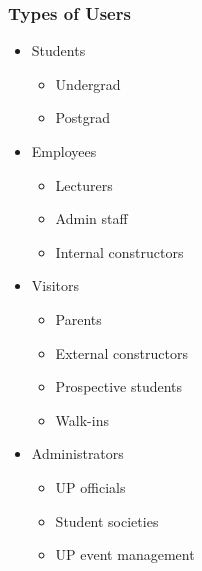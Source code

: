 \documentclass{article}
\begin{document}
		\subsubsection{Types of Users}
			\begin{itemize}
				\item Students
				\begin{itemize}
					\item Undergrad
					\item Postgrad
				\end{itemize}
				
				\item Employees
				\begin{itemize}
					\item Lecturers
					\item Admin staff
					\item Internal constructors
				\end{itemize}
				
				\item Visitors
				\begin{itemize}
					\item Parents
					\item External constructors
					\item Prospective students
					\item Walk-ins
				\end{itemize}
				
				\item Administrators
				\begin{itemize}
					\item UP officials
					\item Student societies
					\item UP event management
				\end{itemize}
			\end{itemize}
\end{document}
